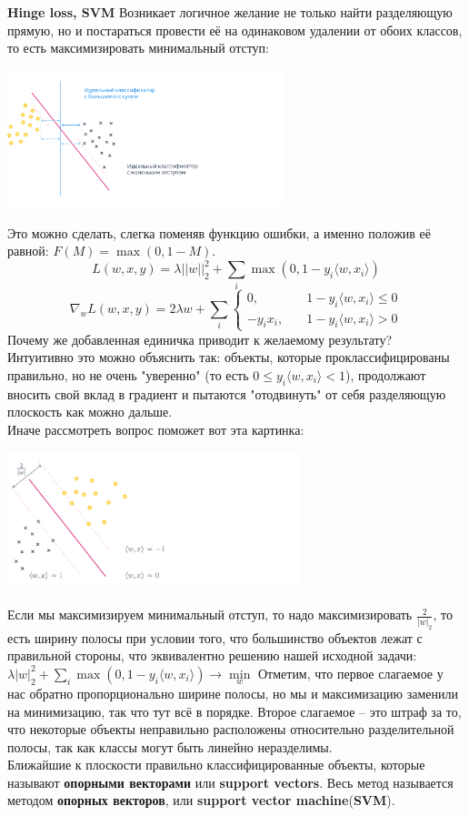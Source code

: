 \textbf{Hinge loss, SVM} Возникает логичное желание не только найти разделяющую прямую, но и постараться провести её на одинаковом удалении от обоих классов, то есть максимизировать минимальный отступ:
\begin{center}
    \centering
    \includegraphics[height=4cm]{pics/t_osn24_4.png}
\end{center}
Это можно сделать, слегка поменяв функцию ошибки, а именно положив её равной:
$F(M) = \max(0, 1-M)$.
$$L(w, x, y) = \lambda||w||^2_2 + \sum_i \max(0, 1-y_i \langle w, x_i\rangle)$$
$$\nabla_w L(w, x, y) = 2 \lambda w + \sum_i
        \begin{cases} 
             0,      & \quad      1 - y_i \langle w, x_i \rangle \leq 0 \\ 
            - y_i x_i, & \quad   1 - y_i \langle w, x_i \rangle > 0
        \end{cases}$$ 
Почему же добавленная единичка приводит к желаемому результату? \\ Интуитивно это можно объяснить так: объекты, которые проклассифицированы правильно, но не очень "уверенно" (то есть $0 \leq y_i \langle w, x_i\rangle < 1$), продолжают вносить свой вклад в градиент и пытаются "отодвинуть" от себя разделяющую плоскость как можно дальше. \\
Иначе рассмотреть вопрос поможет вот эта картинка:
\begin{center}
    \includegraphics[height=4cm]{pics/t_osn24_5.png}
\end{center}
Если мы максимизируем минимальный отступ, то надо максимизировать $\frac{2}{|w|_2}$, то есть ширину полосы при условии того, что большинство объектов лежат с правильной стороны, что эквивалентно решению нашей исходной задачи:
$\lambda|w|^2_2 + \sum_i \max(0, 1-y_i \langle w, x_i\rangle) \longrightarrow\min\limits_{w}$
Отметим, что первое слагаемое у нас обратно пропорционально ширине полосы, но мы и максимизацию заменили на минимизацию, так что тут всё в порядке. Второе слагаемое – это штраф за то, что некоторые объекты неправильно расположены относительно разделительной полосы, так как классы могут быть линейно неразделимы. \\
Ближайшие к плоскости правильно классифицированные объекты, которые называют \textbf{опорными векторами} или \textbf{support vectors}. Весь метод называется методом \textbf{опорных векторов}, или \textbf{support vector machine}(\textbf{SVM}). 

